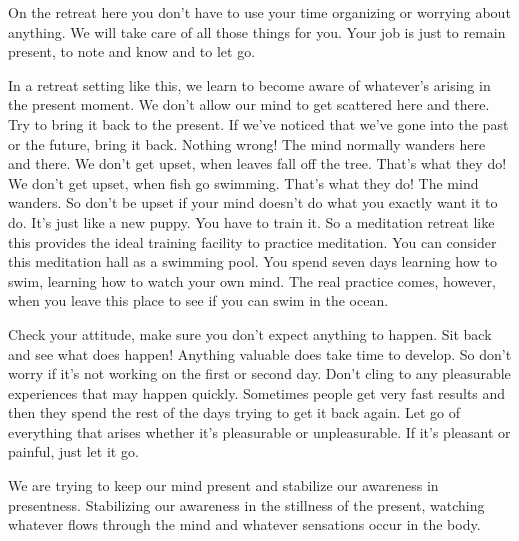 \documentclass[letterpaper,10pt,english]{sphinxmanual}
\begin{document}
\sphinxAtStartPar
On the retreat here you don’t have to use your time organizing or worrying about anything. We will take care of all those things for you. Your job
is just to remain present, to note and know and to let go.

\sphinxAtStartPar
In a retreat setting like this, we learn to become aware of whatever’s
arising in the present moment. We don’t allow our mind to get scattered here
and there. Try to bring it back to the present. If we’ve noticed that we’ve
gone  into  the  past  or  the  future,  bring  it  back.  Nothing  wrong!  The  mind
normally wanders here and there. We don’t get upset, when leaves fall off the
tree. That’s what they do! We don’t get upset, when fish go swimming. That’s
what they do! The mind wanders. So don’t be upset if your mind doesn’t do
what you exactly want it to do. It’s just like a new puppy. You have to train it.
So a meditation retreat like this provides the ideal training facility to
practice  meditation. You  can  consider  this  meditation  hall  as  a  swimming
pool. You spend seven days learning how to swim, learning how to watch
your own mind. The real practice comes, however, when you leave this place
   to see if you can swim in the ocean.

\sphinxAtStartPar
Check your attitude, make sure you don’t expect anything to happen.
Sit  back  and  see  what  does  happen! Anything  valuable  does  take  time  to
develop. So don’t worry if it’s not working on the first or second day. Don’t
cling  to  any  pleasurable  experiences  that  may  happen  quickly.  Sometimes
people get very fast results and then they spend the rest of the days trying to
get it back again. Let go of everything that arises whether it’s pleasurable or
unpleasurable. If it’s pleasant or painful, just let it go.

\sphinxAtStartPar
We are trying to keep our mind present and stabilize our awareness in
presentness. Stabilizing our awareness in the stillness of the present, watching whatever flows through the mind and whatever sensations occur in the
body.
\end{document}
